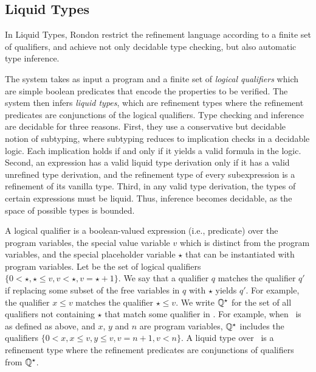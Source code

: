 %

\subsection{Liquid Types}\label{subsec:liquid}

In Liquid Types\cite{LiquidPLDI08}, 
Rondon \etal restrict the refinement language according to a 
finite set of qualifiers, and achieve not only decidable type checking, but also automatic
type inference.

The system takes as input a program and 
a finite set of \textit{logical qualifiers}
which are simple boolean predicates 
that encode the properties to be verified. 
The system then infers
\textit{liquid types}, which are refinement types where the refinement predicates are conjunctions of the logical qualifiers.
Type checking and inference are decidable for
three reasons. 
%
First, they use a conservative but decidable
notion of subtyping, where 
subtyping reduces to implication checks in a decidable logic.
Each implication holds if and only if it yields a valid formula in
the logic. 
%
Second, an expression has a valid liquid type derivation
only if it has a valid unrefined type derivation, and the refinement 
type of every subexpression is a refinement of its vanilla type. 
%
Third, in any valid type derivation, the types of certain expressions
must be liquid. Thus, inference becomes decidable, as the space of
possible types is bounded. 


A logical qualifier is a
boolean-valued expression (i.e., predicate) over the program variables, 
the special value variable $v$ which is distinct from the
program variables, and the special placeholder variable $\star$ that
can be instantiated with program variables. 
Let \qset be the set of logical qualifiers
$\{0 < \star, \star \leq v, v < \star,  v = \star + 1\}$. 
%
We say that
a qualifier $q$ matches the qualifier $q'$
if replacing some subset of
the free variables in $q$ with $\star$ yields $q'$.
For example, the qualifier
$x \leq v$ matches the qualifier $\star \leq v$. 
We write $\mathbb{Q}^\star$
for the set of all
qualifiers not containing $\star$ that match some qualifier in \qset. 
For example, when \qset\ is as defined as above, 
and $x$, $y$ and $n$ are program variables,
$\mathbb{Q}^\star$
includes the qualifiers
$\{0 < x, x \leq v, y \leq v, v = n + 1, v <n\}$. 
A liquid type over \qset\ is a refinement type where the refinement predicates are
conjunctions of qualifiers from $\mathbb{Q} ^ \star$.

